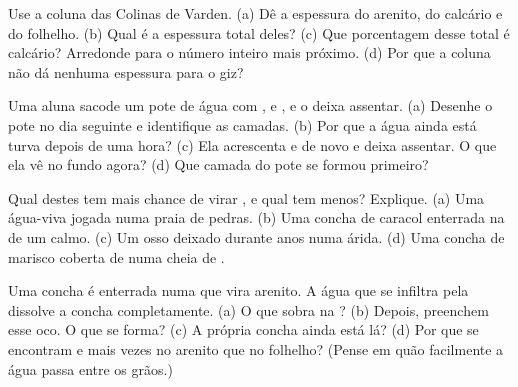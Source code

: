 \begin{exercise}[$\star\star$]\label{exo:g7:sediments-and-fossils:5}
Use a coluna das Colinas de Varden. (a) Dê a espessura do arenito, do
calcário e do folhelho. (b) Qual é a espessura total deles? (c) Que
porcentagem desse total é calcário? Arredonde para o número inteiro mais
próximo. (d) Por que a coluna não dá nenhuma espessura para o giz?
\end{exercise}

\begin{exercise}[$\star\star$]\label{exo:g7:sediments-and-fossils:6}
Uma aluna sacode um pote de água com ,  e , e o deixa
assentar. (a) Desenhe o pote no dia seguinte e identifique as camadas.
(b) Por que a água ainda está turva depois de uma hora? (c) Ela
acrescenta  e  de novo e deixa assentar. O que ela vê no fundo
agora? (d) Que camada do pote se formou primeiro?
\end{exercise}

\begin{exercise}[$\star\star$]\label{exo:g7:sediments-and-fossils:7}
Qual destes tem mais chance de virar , e qual tem menos? Explique.
(a) Uma água-viva jogada numa praia de pedras. (b) Uma concha de caracol
enterrada na  de um  calmo. (c) Um osso deixado durante anos numa
 árida. (d) Uma concha de marisco coberta de  numa cheia de
.
\end{exercise}

\begin{exercise}[$\star\star$]\label{exo:g7:sediments-and-fossils:8}
Uma concha é enterrada numa  que vira arenito. A água que se
infiltra pela  dissolve a concha completamente. (a) O que sobra na
? (b) Depois,  preenchem esse oco. O que se forma? (c) A
própria concha ainda está lá? (d) Por que se encontram  e
 mais vezes no arenito que no folhelho? (Pense em quão
facilmente a água passa entre os grãos.)
\end{exercise}

